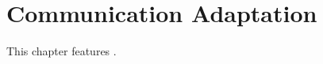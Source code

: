 \chapter{Communication Adaptation}
\label{cha:adapt-comm}

This chapter features \sysname{}.









% 

